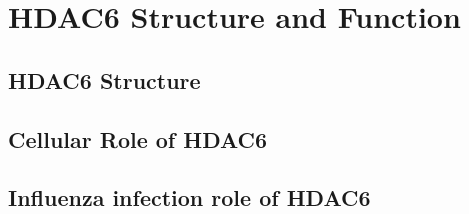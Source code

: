 \section{HDAC6 Structure and Function}

\subsection{HDAC6 Structure}

\subsection{Cellular Role of HDAC6}

\subsection{Influenza infection role of HDAC6}